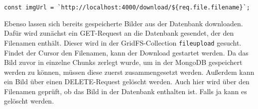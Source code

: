 \begin{lstlisting}[caption=Speicherort des Bildes, label=lst:speicherortbild]
    const imgUrl = `http://localhost:4000/download/${req.file.filename}`;
\end{lstlisting}

Ebenso lassen sich bereits gespeicherte Bilder aus der Datenbank downloaden. Dafür wird zunächst ein GET-Request an die Datenbank gesendet, der den Filenamen enthält. Dieser wird in der GridFS-Collection \texttt{fileupload} gesucht. Findet der Cursor den Filenamen, kann der Download gestartet werden. Da das Bild zuvor in einzelne Chunks zerlegt wurde, um in der MongoDB gespeichert werden zu können, müssen diese zuerst zusammengesetzt werden. 
Außerdem kann ein Bild über einen DELETE-Request gelöscht werden. Auch hier wird über den Filenamen geprüft, ob das Bild in der Datenbank enthalten ist. Falls ja kann es gelöscht werden.
